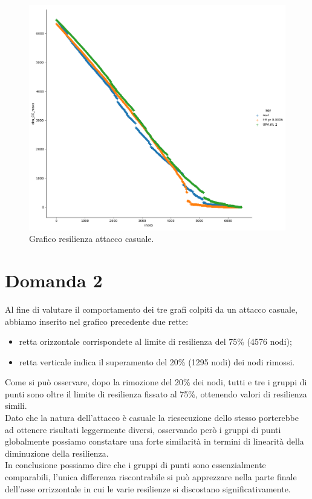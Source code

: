 \documentclass{article}
\begin{document}
\begin{landscape}
	\begin{figure}
		\centering
		\includegraphics[width=1.4\textwidth]{figures/figure_maxdree}
		\caption{Grafico resilienza attacco casuale.}
	\end{figure}
\end{landscape}

\newpage
\section*{Domanda 2}
Al fine di valutare il comportamento dei tre grafi colpiti da un attacco casuale, abbiamo inserito nel grafico precedente due rette:
\begin{itemize}
	\item retta orizzontale corrispondete al limite di resilienza del 75\% (4576 nodi);
	\item retta verticale indica il superamento del 20\% (1295 nodi) dei nodi rimossi. 
\end{itemize}
Come si può osservare, dopo la rimozione del 20\% dei nodi, tutti e tre i gruppi di punti sono oltre il limite di resilienza fissato al 75\%, ottenendo valori di resilienza simili.\\
Dato che la natura dell'attacco è casuale la riesecuzione dello stesso porterebbe ad ottenere risultati leggermente diversi, osservando però i gruppi di punti globalmente possiamo constatare una forte similarità in termini di linearità della diminuzione della resilienza.\\
In conclusione possiamo dire che i gruppi di punti sono essenzialmente comparabili, l'unica differenza riscontrabile si può apprezzare nella parte finale dell'asse orrizzontale in cui le varie resilienze si discostano significativamente.
\end{document}
